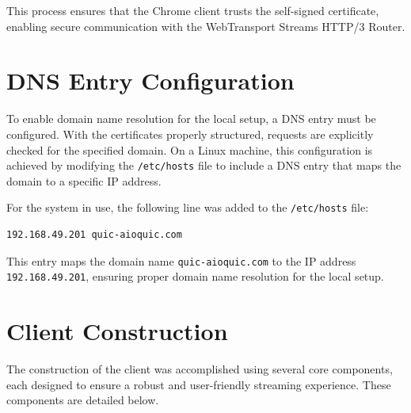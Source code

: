 This process ensures that the Chrome client trusts the self-signed certificate, enabling secure communication with the WebTransport Streams HTTP/3 Router.





\section{DNS Entry Configuration}
To enable domain name resolution for the local setup, a DNS entry must be configured. With the certificates properly structured, requests are explicitly checked for the specified domain. On a Linux machine, this configuration is achieved by modifying the \texttt{/etc/hosts} file to include a DNS entry that maps the domain to a specific IP address.

For the system in use, the following line was added to the \texttt{/etc/hosts} file:

\begin{lstlisting}[breaklines=true,basicstyle=\small\ttfamily,frame=single]
192.168.49.201 quic-aioquic.com
\end{lstlisting}

This entry maps the domain name \texttt{quic-aioquic.com} to the IP address \texttt{192.168.49.201}, ensuring proper domain name resolution for the local setup.




\section{Client Construction}
The construction of the client was accomplished using several core components, each designed to ensure a robust and user-friendly streaming experience. These components are detailed below.

